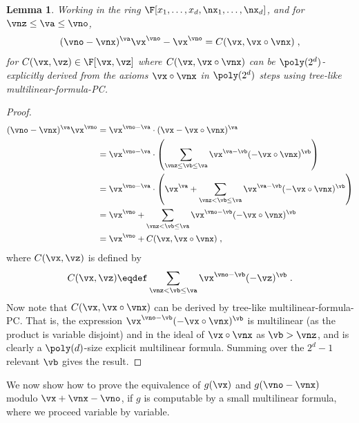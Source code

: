 \documentclass[11pt]{article}
\numberwithin{equation}{section}
\newtheorem{lemma}[theorem]{Lemma}
\theoremstyle{definition}
\theoremstyle{plain}
\begin{document}
\begin{lemma}\label{res:mult-form-PC:mon-mon}
        Working in the ring $\F[x_1,\ldots,x_d,\nx_1,\ldots,\nx_d]$, and for $\vnz\le\va\le \vno$,
        \[
                (\vno-\vnx)^\va\vx^\vno-\vx^\vno
                =C(\vx,\vx\circ\vnx)
                \;,
        \]
        for $C(\vx,\vz)\in\F[\vx,\vz]$ where $C(\vx,\vx\circ\vnx)$ can be $\poly(2^d)$-explicitly derived from the axioms $\vx\circ\vnx$ in $\poly(2^d)$ steps using tree-like multilinear-formula-PC.
\end{lemma}
\begin{proof}
        \begin{align*}
                (\vno-\vnx)^\va\vx^\vno
                &=\vx^{\vno-\va}\cdot (\vx-\vx\circ\vnx)^\va\\
                &=\vx^{\vno-\va}\cdot \left(\sum_{\vnz\le\vb\le\va} \vx^{\va-\vb}(-\vx\circ\vnx)^{\vb}\right)\\
                &=\vx^{\vno-\va}\cdot \left(\vx^\va+\sum_{\vnz<\vb\le\va} \vx^{\va-\vb}(-\vx\circ\vnx)^{\vb}\right)\\
                &=\vx^\vno+\sum_{\vnz<\vb\le\va} \vx^{\vno-\vb}(-\vx\circ\vnx)^{\vb}\\
                &=\vx^\vno+C(\vx,\vx\circ\vnx)
                \;,
        \end{align*}
        where $C(\vx,\vz)$ is defined by
        \[
                C(\vx,\vz)\eqdef\sum_{\vnz<\vb\le\va} \vx^{\vno-\vb}(-\vz)^{\vb}
                \;.
        \]
        Now note that $C(\vx,\vx\circ\vnx)$ can be derived by tree-like multilinear-formula-PC\@.  That is, the expression $\vx^{\vno-\vb}(-\vx\circ\vnx)^{\vb}$ is multilinear (as the product is variable disjoint) and in the ideal of $\vx\circ\vnx$ as $\vb>\vnz$, and is clearly a $\poly(d)$-size explicit multilinear formula. Summing over the $2^d-1$ relevant $\vb$ gives the result.
\end{proof}

We now show how to prove the equivalence of $g(\vx)$ and $g(\vno-\vnx)$ modulo $\vx+\vnx-\vno$, if $g$ is computable by a small multilinear formula, where we proceed variable by variable.
\end{document}
